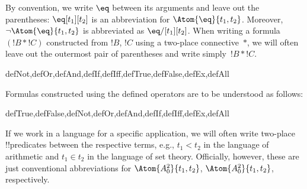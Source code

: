 \documentclass[../../../include/open-logic-section]{subfiles}
\begin{document}
By convention, we write $\eq$ between its arguments and leave out the
parentheses: $\eq[t_1][t_2]$ is an abbreviation for
$\Atom{\eq}{t_1,t_2}$.  Moreover, $\lnot \Atom{\eq}{t_1,t_2}$ is
abbreviated as $\eq/[t_1][t_2]$. When writing a formula $(!B \ast !C)$
constructed from $!B$, $!C$ using a two-place connective~$\ast$, we
will often leave out the outermost pair of parentheses and write
simply~$!B \ast !C$.

\begin{tagblock}{defNot,defOr,defAnd,defIf,defIff,defTrue,defFalse,defEx,defAll}
\begin{defn}
Formulas constructed using the defined operators are to be understood
as follows:

\begin{tagenumerate}{defTrue,defFalse,defNot,defOr,defAnd,defIf,defIff,defEx,defAll}









\end{tagenumerate}
\end{defn}
\end{tagblock}

If we work in a language for a specific application, we will often
write two-place !!{predicate}s between the
respective terms, e.g., $t_1 < t_2$ in the language
of arithmetic and $t_1 \in t_2$ in the language of set theory. Officially, however,
these are just conventional abbreviations for $\Atom{A^2_0}{t_1, t_2}$,
$\Atom{A^2_0}{t_1, t_2}%
$, respectively.
\end{document}

